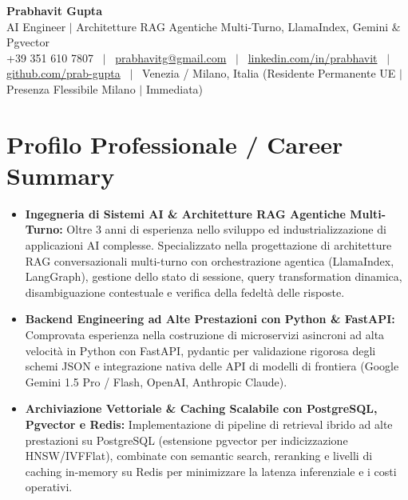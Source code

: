 \documentclass[a4paper,10pt]{article}
\begin{document}
\begin{minipage}[c]{0.80\textwidth}
  {\Huge\bfseries Prabhavit Gupta}\\[3pt]
  {\color{accent}\large AI Engineer $\vert$ Architetture RAG Agentiche Multi-Turno, LlamaIndex, Gemini $\&$ Pgvector}\\[6pt]
  {\footnotesize +39 351 610 7807 ~$\vert$~
  \href{mailto:prabhavitg@gmail.com}{prabhavitg@gmail.com} ~$\vert$~
  \href{https://www.linkedin.com/in/prabhavit/}{linkedin.com/in/prabhavit} ~$\vert$~
  \href{https://github.com/prab-gupta}{github.com/prab-gupta} ~$\vert$~
  Venezia / Milano, Italia (Residente Permanente UE $\vert$ Presenza Flessibile Milano $\vert$ Immediata)}
\end{minipage}\hfill

\vspace{6pt}

\section{Profilo Professionale / Career Summary}
\begin{itemize}
  \item \textbf{Ingegneria di Sistemi AI \& Architetture RAG Agentiche Multi-Turno:} Oltre 3 anni di esperienza nello sviluppo ed industrializzazione di applicazioni AI complesse. Specializzato nella progettazione di architetture RAG conversazionali multi-turno con orchestrazione agentica (LlamaIndex, LangGraph), gestione dello stato di sessione, query transformation dinamica, disambiguazione contestuale e verifica della fedeltà delle risposte.
  \item \textbf{Backend Engineering ad Alte Prestazioni con Python \& FastAPI:} Comprovata esperienza nella costruzione di microservizi asincroni ad alta velocità in Python con FastAPI, pydantic per validazione rigorosa degli schemi JSON e integrazione nativa delle API di modelli di frontiera (Google Gemini 1.5 Pro / Flash, OpenAI, Anthropic Claude).
  \item \textbf{Archiviazione Vettoriale \& Caching Scalabile con PostgreSQL, Pgvector e Redis:} Implementazione di pipeline di retrieval ibrido ad alte prestazioni su PostgreSQL (estensione pgvector per indicizzazione HNSW/IVFFlat), combinate con semantic search, reranking e livelli di caching in-memory su Redis per minimizzare la latenza inferenziale e i costi operativi.
\end{itemize}
\end{document}
